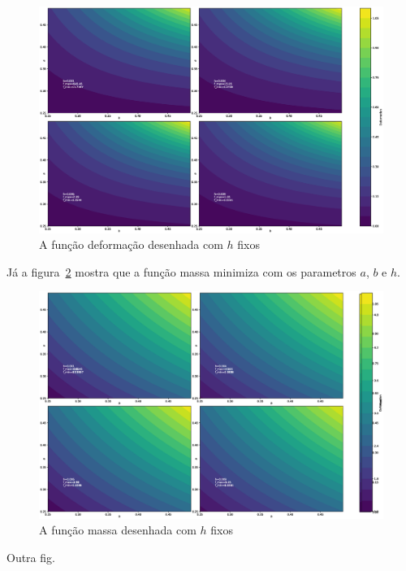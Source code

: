 \documentclass[a4paper,12pt]{article}
\begin{document}
\begin{figure}[!htbp]
\begin{center}
\includegraphics[scale=0.3]{deformacao.eps}
\end{center}
\caption{\label{fig:defImDef}A função deformação desenhada com $h$ fixos}
\end{figure}

Já a figura~\ref{fig:defImMass} mostra que a função massa minimiza com os parametros $a$, $b$ e $h$. 

\begin{figure}[!htbp]
\begin{center}
\includegraphics[scale=0.3]{massa.eps}
\end{center}
\caption{\label{fig:defImMass}A função massa desenhada com $h$ fixos}
\end{figure}

Outra fig.
\end{document}
